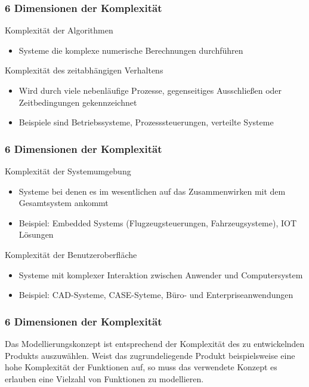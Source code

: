 \begin{frame}
\frametitle{6 Dimensionen der Komplexität}
	Komplexität der Algorithmen
	\begin{itemize}
		\item Systeme die komplexe numerische Berechnungen durchführen
	\end{itemize}
	\bigskip
	Komplexität des zeitabhängigen Verhaltens
	\begin{itemize}
		\item Wird durch viele nebenläufige Prozesse, gegenseitiges Ausschließen oder Zeitbedingungen gekennzeichnet
		\item Beispiele sind Betriebssysteme, Prozesssteuerungen, verteilte Systeme
	\end{itemize}
\end{frame}

\begin{frame}
\frametitle{6 Dimensionen der Komplexität}
	Komplexität der Systemumgebung
	\begin{itemize}
		\item Systeme bei denen es im wesentlichen auf das Zusammenwirken mit dem Gesamtsystem ankommt
		\item Beispiel: Embedded Systems (Flugzeugsteuerungen, Fahrzeugsysteme), IOT Lösungen
	\end{itemize}
	\bigskip
	Komplexität der Benutzeroberfläche
	\begin{itemize}
		\item Systeme mit komplexer Interaktion zwischen Anwender und Computersystem
		\item Beispiel: CAD-Systeme, CASE-Syteme, Büro- und Enterpriseanwendungen
	\end{itemize}
\end{frame}

\begin{frame}
\frametitle{6 Dimensionen der Komplexität}
	Das Modellierungskonzept ist entsprechend der Komplexität des zu entwickelnden Produkts auszuwählen.
	Weist das zugrundeliegende Produkt beispielsweise eine hohe Komplexität der Funktionen auf, so muss das verwendete
	Konzept es erlauben eine Vielzahl von Funktionen zu modellieren.
\end{frame}


